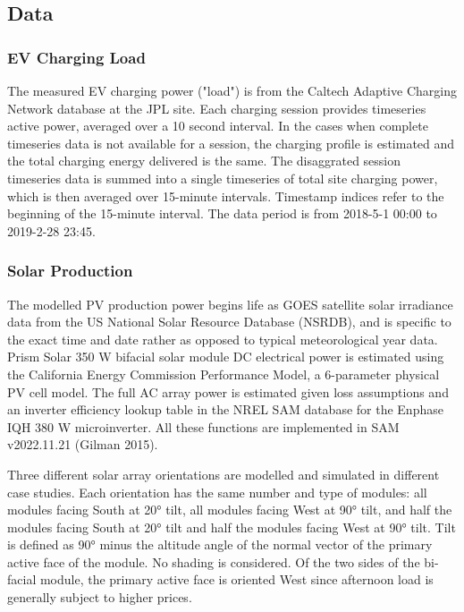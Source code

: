 \documentclass[
]{article}
\begin{document}
\hypertarget{data}{%
\subsection{Data}\label{data}}

\hypertarget{ev-charging-load}{%
\subsubsection{EV Charging Load}\label{ev-charging-load}}

The measured EV charging power ("load") is from the Caltech Adaptive
Charging Network database at the JPL site. Each charging session
provides timeseries active power, averaged over a 10 second interval. In
the cases when complete timeseries data is not available for a session,
the charging profile is estimated and the total charging energy
delivered is the same. The disaggrated session timeseries data is summed
into a single timeseries of total site charging power, which is then
averaged over 15-minute intervals. Timestamp indices refer to the
beginning of the 15-minute interval. The data period is from 2018-5-1
00:00 to 2019-2-28 23:45.

\hypertarget{solar-production}{%
\subsubsection{Solar Production}\label{solar-production}}

The modelled PV production power begins life as GOES satellite solar
irradiance data from the US National Solar Resource Database (NSRDB),
and is specific to the exact time and date rather as opposed to typical
meteorological year data. Prism Solar 350 W bifacial solar module DC
electrical power is estimated using the California Energy Commission
Performance Model, a 6-parameter physical PV cell model. The full AC
array power is estimated given loss assumptions and an inverter
efficiency lookup table in the NREL SAM database for the Enphase IQH 380
W microinverter. All these functions are implemented in SAM v2022.11.21
(Gilman 2015).

Three different solar array orientations are modelled and simulated in
different case studies. Each orientation has the same number and type of
modules: all modules facing South at 20° tilt, all modules facing West
at 90° tilt, and half the modules facing South at 20° tilt and half the
modules facing West at 90° tilt. Tilt is defined as 90° minus the
altitude angle of the normal vector of the primary active face of the
module. No shading is considered. Of the two sides of the bi-facial
module, the primary active face is oriented West since afternoon load is
generally subject to higher prices.
\end{document}
